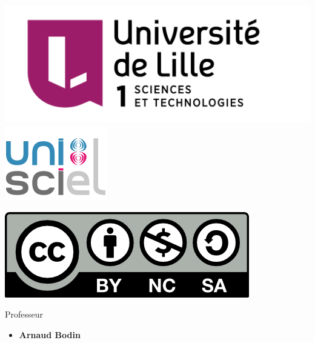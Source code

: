 





\begin{frame}

\thispagestyle{empty}    

  \hspace*{-20ex}
  \begin{minipage}{0.35\textwidth}
  \begin{center}
    \vspace*{5ex}   


    \bigskip

    \includegraphics[scale=0.13]{../divers/Logo-Univ-Lille-1-new.png}
    \quad
    \includegraphics[scale=0.3]{../divers/logo-unisciel.png}

    \vspace*{5ex}

    \includegraphics[scale=0.5]{../divers/by-nc-sa.png}
  \end{center}
  \end{minipage}
  \hfil
  \begin{minipage}{0.90\textwidth}
  \footnotesize
   \vspace*{2ex}
  Professeur
  \begin{itemize}
    \item {\bf Arnaud Bodin}  
  \end{itemize} 
  

\end{minipage}
\end{frame}
